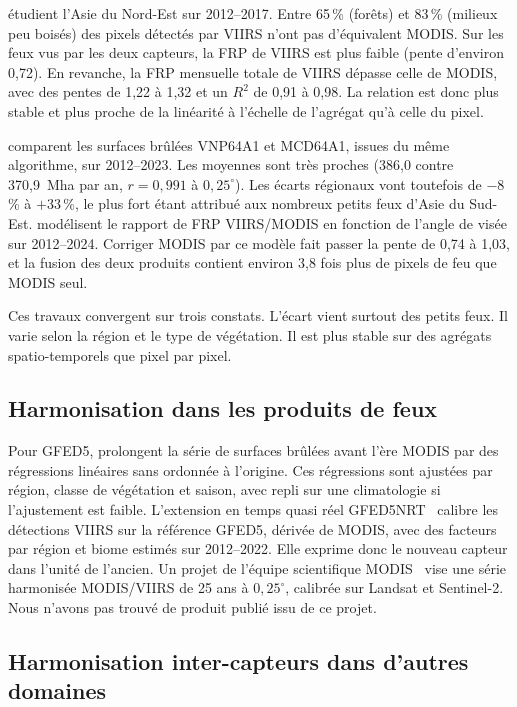 \documentclass[11pt,a4paper]{article}
\begin{document}
\citet{fu2020} étudient l'Asie du Nord-Est sur 2012--2017. Entre 65\,\% (forêts) et 83\,\% (milieux peu boisés) des pixels détectés par VIIRS n'ont pas d'équivalent MODIS. Sur les feux vus par les deux capteurs, la FRP de VIIRS est plus faible (pente d'environ 0,72). En revanche, la FRP mensuelle totale de VIIRS dépasse celle de MODIS, avec des pentes de 1,22 à 1,32 et un $R^2$ de 0,91 à 0,98. La relation est donc plus stable et plus proche de la linéarité à l'échelle de l'agrégat qu'à celle du pixel.

\citet{giglio2025} comparent les surfaces brûlées VNP64A1 et MCD64A1, issues du même algorithme, sur 2012--2023. Les moyennes sont très proches (386,0 contre 370,9~Mha par an, $r = 0{,}991$ à $0{,}25^\circ$). Les écarts régionaux vont toutefois de $-8$\,\% à $+33$\,\%, le plus fort étant attribué aux nombreux petits feux d'Asie du Sud-Est. \citet{zheng2026} modélisent le rapport de FRP VIIRS/MODIS en fonction de l'angle de visée sur 2012--2024. Corriger MODIS par ce modèle fait passer la pente de 0,74 à 1,03, et la fusion des deux produits contient environ 3,8 fois plus de pixels de feu que MODIS seul.

Ces travaux convergent sur trois constats. L'écart vient surtout des petits feux. Il varie selon la région et le type de végétation. Il est plus stable sur des agrégats spatio-temporels que pixel par pixel.

\subsection{Harmonisation dans les produits de feux}

Pour GFED5, \citet{chen2023} prolongent la série de surfaces brûlées avant l'ère MODIS par des régressions linéaires sans ordonnée à l'origine. Ces régressions sont ajustées par région, classe de végétation et saison, avec repli sur une climatologie si l'ajustement est faible. L'extension en temps quasi réel GFED5NRT~\cite{chen2026} calibre les détections VIIRS sur la référence GFED5, dérivée de MODIS, avec des facteurs par région et biome estimés sur 2012--2022. Elle exprime donc le nouveau capteur dans l'unité de l'ancien. Un projet de l'équipe scientifique MODIS~\cite{boschetti2022} vise une série harmonisée MODIS/VIIRS de 25 ans à $0{,}25^\circ$, calibrée sur Landsat et Sentinel-2. Nous n'avons pas trouvé de produit publié issu de ce projet.

\subsection{Harmonisation inter-capteurs dans d'autres domaines}
\end{document}
